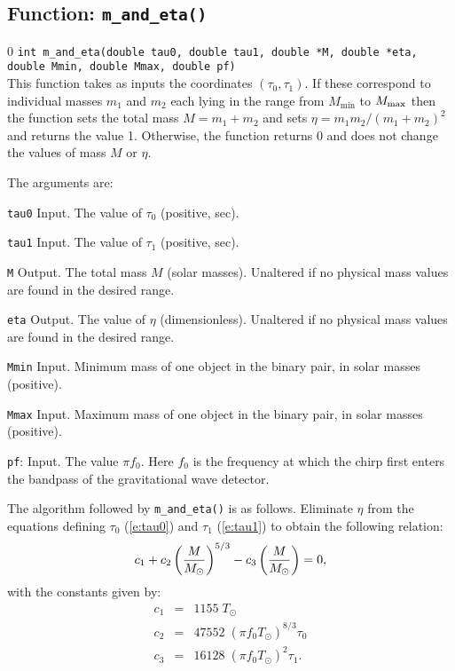 \subsection{Function: {\tt m\_and\_eta()}}
\label{ss:m_and_eta}
\setcounter{equation}0
{\tt int m\_and\_eta(double tau0, double tau1, double *M, double *eta, double Mmin, double Mmax, double pf)}\\
This function takes as inputs the coordinates $(\tau_0,\tau_1)$.  If
these correspond to individual masses $m_1$ and $m_2$ each lying in the
range from $M_{\min}$ to $M_{\rm max}$ then the function sets the total
mass $M=m_1+m_2$ and sets $\eta = m_1 m_2/(m_1+m_2)^2$ and returns the
value 1.  Otherwise, the function returns 0 and does not change the
values of mass $M$ or $\eta$.

The arguments are:
\begin{description}
\item{\tt tau0} Input.  The value of $\tau_0$ (positive, sec).
\item{\tt tau1} Input.  The value of $\tau_1$ (positive, sec).
\item{\tt M} Output.  The total mass $M$ (solar masses).  Unaltered if
no physical mass values are found in the desired range.
\item{\tt eta} Output.  The value of $\eta$ (dimensionless).  Unaltered
if no physical mass values are found in the desired range.
\item{\tt Mmin} Input.  Minimum mass of one object in the binary pair,
  in solar masses (positive).
\item{\tt Mmax} Input.  Maximum mass of one object in the binary pair,
  in solar masses (positive).
\item{\tt pf}: Input.  The value $\pi f_0$. Here $f_0$ is the frequency at which
  the chirp first enters the bandpass of the gravitational wave detector.
\end{description}
The algorithm followed by {\tt m\_and\_eta()} is as follows.  Eliminate
$\eta$ from the equations defining $\tau_0$ (\ref{e:tau0}) and $\tau_1$
(\ref{e:tau1}) to obtain the following relation:
\begin{equation}
\label{e:rooteqn}
c_1 + c_2 \left( {M \over M_\odot} \right)^{5/3} - c_3 \left( {M \over M_\odot} \right) = 0,
\end{equation}
with the constants given by:
\begin{eqnarray}
\nonumber c_1 &=& 1155 \; T_\odot \\
c_2 &=& 47552 \; (\pi f_0 T_\odot )^{8/3} \tau_0\\
\nonumber c_3 &=& 16128 \; (\pi f_0 T_\odot )^2 \tau_1.
\end{eqnarray}
